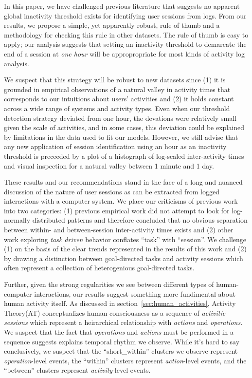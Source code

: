In this paper, we have challenged previous literature that suggests no apparent global inactivity threshold exists for identifying user sessions from logs.  From our results, we propose a simple, yet apparently robust, rule of thumb and a methodology for checking this rule in other datasets.  The rule of thumb is easy to apply; our analysis suggests that setting an inactivity threshold to demarcate the end of a session at \emph{one hour} will be appropropriate for most kinds of activity log analysis.

We suspect that this strategy will be robust to new datasets since (1) it is grounded in empirical observations of a natural valley in activity times that corresponds to our intuitions about users' activities and (2) it holds constant across a wide range of systems and activity types. Even when our threshold detection strategy deviated from one hour, the devations were relatively small given the scale of activities, and in some cases, this deviation could be explained by limitations in the data used to fit our models.  However, we still advise that any new application of session identification using an hour as an inactivity threshold is preceeded by a plot of a histograph of log-scaled inter-activity times and visual inspection for a natural valley between 1 minute and 1 day.

These results and our recommendations stand in the face of a long and nuanced discussion of the nature of user sessions as can be extracted from logged interactions with a computer system.  We place our criticisms of previous work into two categories: (1) previous empirical work did not attempt to look for log-normally distributed patterns and therefore concluded that no obvious separation between within- and between-session inter-activity times exists\cite{mehrzadi2012onextracting}\cite{catledge1995characterizing} and (2) other work exploring \emph{task driven} behavior conflates ``task'' with ``session''.  We challenge (1) on the basis of the clear trends represented in the results of this work and (2) by drawing a distinction between goal-directed tasks and activity sessions which often represent a collection of heterogenious goal-directed tasks.

Further, given the strong regularities we see between different types of human-computer interactions, our results suggest something more fundimental about human activity itself.  As discussed in section~\ref{sec:human_activities}, Activity Theory(AT) conceptualizes human consciousness as a sequence of \emph{activitie sessions} which represent a heirarchical relationship with \emph{actions} and \emph{operations}.  We suspect that the fact that \emph{operations} and \emph{actions} must be performed in a sequence suggests explains temporal rhythm we observe.  While it's hard to say conclusively, we suspect that the ``short\_within'' clusters we observe represent \emph{operation}-level events, the ``within'' clusters represent \emph{action}-level events, and the ``between'' clusters represent \emph{activity}-level events.

